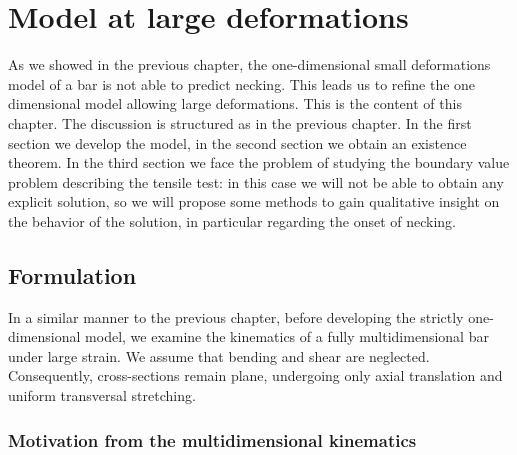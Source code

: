 \documentclass[a4paper,10pt,oneside]{amsbook}
\numberwithin{section}{chapter}
\numberwithin{equation}{chapter}
\theoremstyle{definition}
\begin{document}
\chapter{Model at large deformations}
\label{chap:large-neck}

As we showed in the previous chapter, the one-dimensional small deformations model of a bar is not able to predict necking. This leads us to refine the one dimensional model allowing large deformations. This is the content of this chapter. The discussion is structured as in the previous chapter. In the first section we develop the model, in the second section we obtain an existence theorem. In the third section we face the problem of studying the boundary value problem describing the tensile test: in this case we will not be able to obtain any explicit solution, so we will propose some methods to gain qualitative insight on the behavior of the solution, in particular regarding the onset of necking.

\section{Formulation}

In a similar manner to the previous chapter, before developing the strictly one-dimensional model, we examine the kinematics of a fully multidimensional bar under large strain. We assume that bending and shear are neglected. Consequently, cross-sections remain plane, undergoing only axial translation and uniform transversal stretching.

\subsection{Motivation from the multidimensional kinematics}
\label{subsec:motivation-large}
\end{document}
